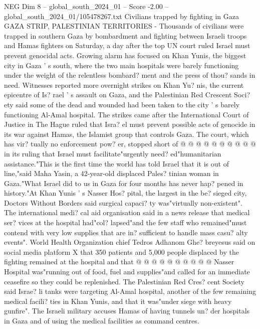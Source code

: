 \begin{textsample}{NEG Dim 8 – global\_south\_2024\_01 – Score -2.00 – global\_south\_2024\_01/105478267.txt}  \label{ex:f8_neg_048}
Civilians trapped by fighting in Gaza GAZA STRIP, PALESTINIAN TERRITORIES - Thousands of civilians were trapped in southern Gaza by bombardment and fighting between Israeli troops and Hamas fighters on Saturday, a day after the top UN court ruled Israel must prevent genocidal acts.
Growing alarm has focused on Khan Yunis, the biggest city in Gaza ' s south, where the two main hospitals were barely functioning under the weight of the relentless bombard? ment and the press of thou? sands in need.
Witnesses reported more overnight strikes on Khan Yu? nis, the current epicentre of Is? rael ' s assault on Gaza, and the Palestinian Red Crescent Soci? ety said some of the dead and wounded had been taken to the city ' s barely functioning Al-Amal hospital.
The strikes came after the International Court of Justice in The Hague ruled that Isra? el must prevent possible acts of genocide in its war against Hamas, the Islamist group that controls Gaza.
The court, which has vir? tually no enforcement pow? er, stopped short of @ @ @ @ @ @ @ @ @ @ in its ruling that Israel must facilitate"urgently need? ed"humanitarian assistance."This is the first time the world has told Israel that it is out of line,"said Maha Yasin, a 42-year-old displaced Pales? tinian woman in Gaza."What Israel did to us in Gaza for four months has never hap? pened in history."At Khan Yunis ' s Nasser Hos? pital, the largest in the be? sieged city, Doctors Without Borders said surgical capaci? ty was"virtually non-existent".
The international medi? cal aid organisation said in a news release that medical ser? vices at the hospital had"col? lapsed"and the few staff who remained"must contend with very low supplies that are in? sufficient to handle mass casu? alty events".
World Health Organization chief Tedros Adhanom Ghe? breyesus said on social media platform X that 350 patients and 5,000 people displaced by the fighting remained at the hospital and that @ @ @ @ @ @ @ @ @ @ Nasser Hospital was"running out of food, fuel and supplies"and called for an immediate ceasefire so they could be replenished.
The Palestinian Red Cres? cent Society said Israe? li tanks were targeting Al-Amal hospital, another of the few remaining medical facili? ties in Khan Yunis, and that it was"under siege with heavy gunfire".
The Israeli military accuses Hamas of having tunnels un? der hospitals in Gaza and of using the medical facilities as command centres.

\end{textsample}
